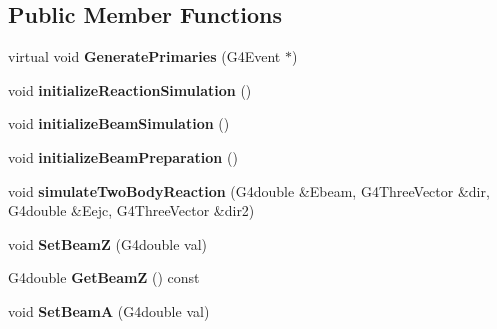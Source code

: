 \subsection*{Public Member Functions}
\begin{DoxyCompactItemize}
\item 
\hypertarget{classEMMAPrimaryGeneratorAction_a494c4e386580292e35a7cb96a48b50ac}{virtual void {\bfseries Generate\-Primaries} (G4\-Event $\ast$)}\label{classEMMAPrimaryGeneratorAction_a494c4e386580292e35a7cb96a48b50ac}

\item 
\hypertarget{classEMMAPrimaryGeneratorAction_a9e3503656a81f1978a84857e14d0d4cf}{void {\bfseries initialize\-Reaction\-Simulation} ()}\label{classEMMAPrimaryGeneratorAction_a9e3503656a81f1978a84857e14d0d4cf}

\item 
\hypertarget{classEMMAPrimaryGeneratorAction_ae78623512eae25e20c9b7098fc47bfac}{void {\bfseries initialize\-Beam\-Simulation} ()}\label{classEMMAPrimaryGeneratorAction_ae78623512eae25e20c9b7098fc47bfac}

\item 
\hypertarget{classEMMAPrimaryGeneratorAction_a18d08425d20692d8ef11fadfeac15959}{void {\bfseries initialize\-Beam\-Preparation} ()}\label{classEMMAPrimaryGeneratorAction_a18d08425d20692d8ef11fadfeac15959}

\item 
\hypertarget{classEMMAPrimaryGeneratorAction_a17ed29b853469bbd1452e4cb141a2af8}{void {\bfseries simulate\-Two\-Body\-Reaction} (G4double \&Ebeam, G4\-Three\-Vector \&dir, G4double \&Eejc, G4\-Three\-Vector \&dir2)}\label{classEMMAPrimaryGeneratorAction_a17ed29b853469bbd1452e4cb141a2af8}

\item 
\hypertarget{classEMMAPrimaryGeneratorAction_a78c25e121ccb52c59a240f9b8bd93ca8}{void {\bfseries Set\-Beam\-Z} (G4double val)}\label{classEMMAPrimaryGeneratorAction_a78c25e121ccb52c59a240f9b8bd93ca8}

\item 
\hypertarget{classEMMAPrimaryGeneratorAction_aeab65a4dda7039d62456b4f97de012b7}{G4double {\bfseries Get\-Beam\-Z} () const }\label{classEMMAPrimaryGeneratorAction_aeab65a4dda7039d62456b4f97de012b7}

\item 
\hypertarget{classEMMAPrimaryGeneratorAction_ac8a549a7b2b615e5e05d8a0bcfa87f6d}{void {\bfseries Set\-Beam\-A} (G4double val)}\label{classEMMAPrimaryGeneratorAction_ac8a549a7b2b615e5e05d8a0bcfa87f6d}


\end{DoxyCompactItemize}
